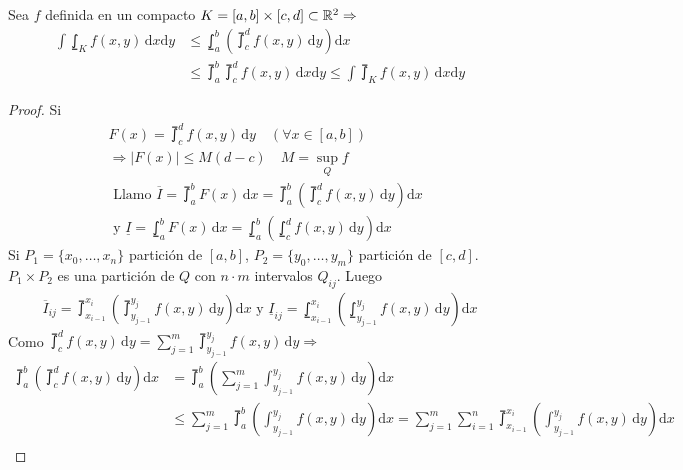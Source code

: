 \begin{theorem}
  Sea \(f\) definida en un compacto \(K = [a, b] \times [c, d] \subset \mathbb{R}^2 \Rightarrow \)
  \begin{align*}
    \int \lowint_K f(x, y) \, \mathrm{d}x \mathrm{d}y & \leq \lowint_a^b(\upint_c^d f(x, y)\, \mathrm{d}y)\mathrm{d}x                                                       \\
                                                      & \leq \upint_a^b \upint_c^d f(x, y) \, \mathrm{d}x \mathrm{d}y \leq \int \upint_K f(x, y) \, \mathrm{d}x \mathrm{d}y
  \end{align*}
  \begin{proof}
    Si \begin{align}
       & F(x) = \upint_c^d f(x, y) \, \mathrm{d}y \quad (\forall x \in [a, b])                                                   \\
       & \Rightarrow |F(x)| \leq M (d - c) \quad M = \sup_Q f                                                                    \\
       & \text{ Llamo } \overline{I} = \upint_a^b F(x)\, \mathrm{d}x = \upint_a^b(\upint_c^d f (x, y)\, \mathrm{d}y) \mathrm{d}x \\
       & \text{ y } \underline{I} = \lowint_a^b F(x)\, \mathrm{d}x = \lowint_a^b(\lowint_c^d f (x, y)\, \mathrm{d}y) \mathrm{d}x
    \end{align}
    Si \(P_1 = \{x_0, \ldots, x_n\} \) partición de \([a, b]\), \(P_2 = \{ y_0, \ldots, y_m \} \) partición de \([c, d]\). \(P_1 \times P_2\) es una partición de \(Q\) con \(n \cdot m\) intervalos \(Q_{ij} \). Luego \begin{align*}
      \overline{I}_{ij} = \upint_{x_{i-1}}^{x_i}( \upint_{y_{j-1}}^{y_j}f(x, y)\,\mathrm{d}y)\mathrm{d}x \text{ y }
      \underline{I}_{ij} = \lowint_{x_{i-1}}^{x_i}( \lowint_{y_{j-1}}^{y_j}f(x, y)\,\mathrm{d}y)\mathrm{d}x
    \end{align*} Como \(\upint_c^d f(x, y)\, \mathrm{d}y = \sum_{j = 1}^m \upint_{y_{j-1}}^{y_j} f(x, y)\, \mathrm{d}y \Rightarrow \) \begin{align*}
      \upint_a^b\left(\upint_c^d f(x, y)\, \mathrm{d}y\right)\mathrm{d}x & = \upint_a^b\left( \sum_{j = 1}^m \int_{y_{j-1}}^{y_j}f(x, y)\, \mathrm{d}y\right)\mathrm{d}x                                                                                                                         \\
                                                                         & \leq \sum_{j = 1}^m \upint_a^b\left(\int_{y_{j-1}}^{y_j}f(x, y)\, \mathrm{d}y\right)\mathrm{d}x = \sum_{j = 1}^m \sum_{i = 1}^n \upint_{x_{i-1}}^{x_i}\left(\int_{y_{j-1}}^{y_j}f(x,y)\,\mathrm{d}y\right)\mathrm{d}x \\

\end{align*}
\end{proof}
\end{theorem}
